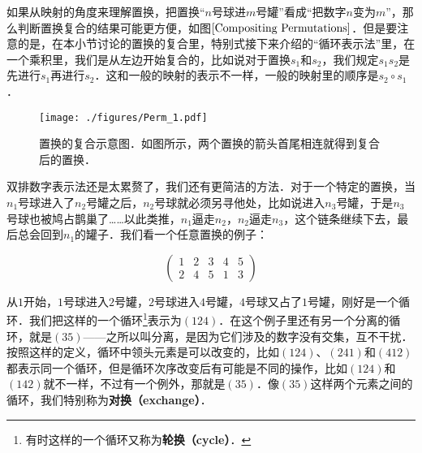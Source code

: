如果从映射的角度来理解置换，把置换“$n$号球进$m$号罐”看成“把数字$n$变为$m$”，那么判断置换复合的结果可能更方便，如图$\ref{Compositing Permutations}$．但是要注意的是，在本小节讨论的置换的复合里，特别式接下来介绍的“循环表示法”里，在一个乘积里，我们是从左边开始复合的，比如说对于置换$s_1$和$s_2$，我们规定$s_1s_2$是先进行$s_1$再进行$s_2$．这和一般的映射的表示不一样，一般的映射里的顺序是$s_2\circ s_1$．




\begin{figure}[ht]
\centering
\texttt{[image: ./figures/Perm\_1.pdf]}
\caption{置换的复合示意图．如图所示，两个置换的箭头首尾相连就得到复合后的置换．}\label{Perm_fig}
\end{figure}


双排数字表示法还是太累赘了，我们还有更简洁的方法．对于一个特定的置换，当$n_1$号球进入了$n_2$号罐之后，$n_2$号球就必须另寻他处，比如说进入$n_3$号罐，于是$n_3$号球也被鸠占鹊巢了……以此类推，$n_1$逼走$n_2$，$n_2$逼走$n_3$，这个链条继续下去，最后总会回到$n_1$的罐子．我们看一个任意置换的例子：

\begin{equation}\begin{pmatrix}
1&2&3&4&5\\2&4&5&1&3
\end{pmatrix}\end{equation}

从$1$开始，$1$号球进入$2$号罐，$2$号球进入$4$号罐，$4$号球又占了$1$号罐，刚好是一个循环．我们把这样的一个循环\footnote{有时这样的一个循环又称为\textbf{轮换（cycle）}．}表示为$(1 2 4)$．在这个例子里还有另一个分离的循环，就是$(3 5)$——之所以叫分离，是因为它们涉及的数字没有交集，互不干扰．按照这样的定义，循环中领头元素是可以改变的，比如$(1 2 4)$、$(2 4 1)$和$(4 1 2)$都表示同一个循环，但是循环次序改变后有可能是不同的操作，比如$(1 2 4)$和$(1 4 2)$就不一样，不过有一个例外，那就是$(3 5)$．像$(3 5)$这样两个元素之间的循环，我们特别称为\textbf{对换（exchange）}．

